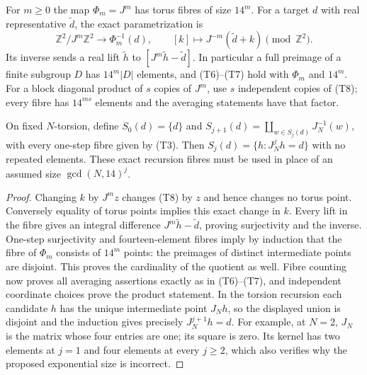 \begin{proposition}
\label{prop:ns-torus-powers}
For $m\geq0$ the map $\Phi_m=J^m$ has torus fibres of size $14^m$.
For a target $d$ with real representative $\widetilde d$, the exact
parametrization is
\[
 \mathbb Z^2/J^m\mathbb Z^2\longrightarrow\Phi_m^{-1}(d),
 \qquad [k]\longmapsto J^{-m}(\widetilde d+k)\pmod{\mathbb Z^2}.
                                                               \tag{T8}
\]
Its inverse sends a real lift $\widetilde h$ to
$[J^m\widetilde h-\widetilde d]$. In particular a full preimage of
a finite subgroup $D$ has $14^m|D|$ elements, and (T6)--(T7)
hold with $\Phi_m$ and $14^m$. For a block diagonal product of $s$
copies of $J^m$, use $s$ independent copies of (T8); every fibre
has $14^{ms}$ elements and the averaging statements have that factor.

On fixed $N$-torsion, define $S_0(d)=\{d\}$ and
$S_{j+1}(d)=\coprod_{w\in S_j(d)}J_N^{-1}(w)$, with every
one-step fibre given by (T3). Then $S_j(d)=\{h:J_N^jh=d\}$
with no repeated elements. These exact recursion fibres must be
used in place of an assumed size $\gcd(N,14)^j$.
\end{proposition}
\begin{proof}
Changing $k$ by $J^m z$ changes (T8) by $z$ and hence changes no
torus point. Conversely equality of torus points implies this exact
change in $k$. Every lift in the fibre gives an integral difference
$J^m\widetilde h-\widetilde d$, proving surjectivity and the inverse.
One-step surjectivity and fourteen-element fibres imply by induction
that the fibre of $\Phi_m$ consists of $14^m$ points: the preimages
of distinct intermediate points are disjoint. This proves the
cardinality of the quotient as well. Fibre counting now proves all
averaging assertions exactly as in (T6)--(T7), and independent
coordinate choices prove the product statement. In the torsion
recursion each candidate $h$ has the unique intermediate point
$J_Nh$, so the displayed union is disjoint and the induction gives
precisely $J_N^{j+1}h=d$. For example, at $N=2$, $J_N$ is the
matrix whose four entries are one; its square is zero. Its kernel
has two elements at $j=1$ and four elements at every $j\geq2$,
which also verifies why the proposed exponential size is incorrect.
\end{proof}

